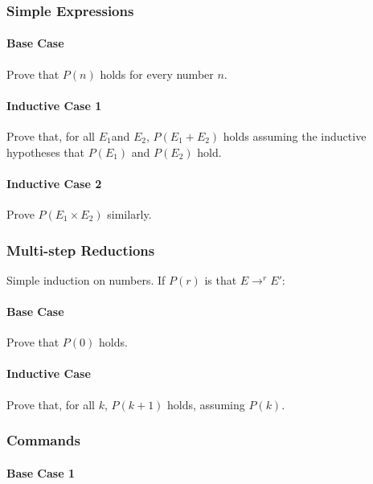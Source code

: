 \documentclass[twocolumn,english]{article}
\begin{document}
\subsubsection{Simple Expressions}


\paragraph{Base Case}

Prove that $P(n)$ holds for every number $n$.


\paragraph{Inductive Case 1}

Prove that, for all $E_{1}$and $E_{2}$, $P\left(E_{1}+E_{2}\right)$
holds assuming the inductive hypotheses that $P\left(E_{1}\right)$
and $P\left(E_{2}\right)$ hold.


\paragraph{Inductive Case 2}

Prove $P\left(E_{1}\times E_{2}\right)$ similarly.


\subsubsection{Multi-step Reductions}

Simple induction on numbers. If $P\left(r\right)$ is that $E\rightarrow^{r}E'$:


\paragraph{Base Case}

Prove that $P\left(0\right)$ holds.


\paragraph{Inductive Case}

Prove that, for all $k$, $P\left(k+1\right)$ holds, assuming $P\left(k\right)$.


\subsubsection{Commands}


\paragraph{Base Case 1}
\end{document}
